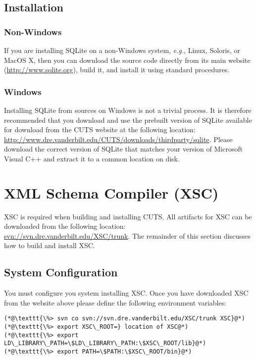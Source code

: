 \subsection{Installation}

\subsubsection{Non-Windows}
 
If you are installing SQLite on a non-Windows system, \textit{e.g.}, Linux, 
Soloris, or MacOS X, then you can download the source code directly from its
main website (\url{http://www.sqlite.org}), build it, and install it using  
standard procedures.

\subsubsection{Windows}

Installing SQLite from sources on Windows is not a trivial process. 
It is therefore recommended that you download and use the prebuilt 
version of SQLite available for download from the CUTS website at the 
following location:
\url{http://www.dre.vanderbilt.edu/CUTS/downloads/thirdparty/sqlite}. Please download
the correct version of SQLite that matches your version of Microsoft Visual
C++ and extract it to a common location on disk.

\section{XML Schema Compiler (XSC)}
\label{sec:thirdparty-xsc}

XSC is required when building and installing CUTS. All artifacts
for XSC can be downloaded from the following location: 
\url{svn://svn.dre.vanderbilt.edu/XSC/trunk}. The remainder of this section
discusses how to build and install XSC.

\subsection{System Configuration}

You must configure you system installing XSC. Once you have downloaded 
XSC from the website above please define the following environment variables:
\begin{lstlisting}
(*@\texttt{\%> svn co svn://svn.dre.vanderbilt.edu/XSC/trunk XSC}@*)
(*@\texttt{\%> export XSC\_ROOT=} location of XSC@*)
(*@\texttt{\%> export LD\_LIBRARY\_PATH=\$LD\_LIBRARY\_PATH:\$XSC\_ROOT/lib}@*)
(*@\texttt{\%> export PATH=\$PATH:\$XSC\_ROOT/bin}@*)
\end{lstlisting}

